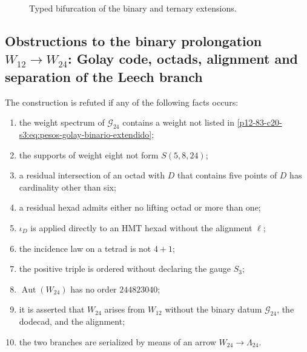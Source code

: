 \begin{figure}[htbp]
\centering
{}
\caption{Typed bifurcation of the binary and ternary extensions.}
\label{p12-83-c20-s3:fig:bifurcacion-w24-leech-autonoma}
\end{figure}

\subsection{Obstructions to the binary prolongation \(W_{12}\to W_{24}\): Golay code, octads, alignment and separation of the Leech branch}

\begin{criterion}
The construction is refuted if any of the following facts occurs:
\begin{enumerate}
 \item the weight spectrum of \(\mathcal G_{24}\) contains a weight not
       listed in \eqref{p12-83-c20-s3:eq:pesos-golay-binario-extendido};
 \item the supports of weight eight not form \(S(5,8,24)\);
 \item a residual intersection of an octad with \(D\) that contains five
       points of \(D\) has cardinality other than six;
 \item a residual hexad admits either no lifting octad or more than one;
 \item \(\iota_D\) is applied directly to an HMT hexad without the alignment \(\ell\);
 \item the incidence law on a tetrad is not \(4+1\);
 \item the positive triple is ordered without declaring the gauge \(S_3\);
 \item \(\operatorname{Aut}(W_{24})\) has no order \(244823040\);
 \item it is asserted that \(W_{24}\) arises from \(W_{12}\) without the binary datum
       \(\mathcal G_{24}\), the dodecad, and the alignment;
 \item the two branches are serialized by means of an arrow
       \(W_{24}\to\Lambda_{24}\).
\end{enumerate}
\end{criterion}


